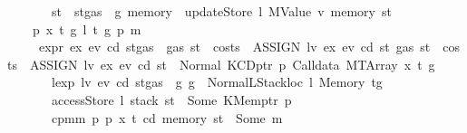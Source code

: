 \begin{isabellebody}
\ \ \ \ \ \ \ {\isachardoublequoteopen}st{\isacharprime}{\kern0pt}\ {\isacharequal}{\kern0pt}\ st{\isasymlparr}gas\ {\isacharcolon}{\kern0pt}{\isacharequal}{\kern0pt}\ g{\isacharprime}{\kern0pt}{\isacharcomma}{\kern0pt}\ memory\ {\isacharcolon}{\kern0pt}{\isacharequal}{\kern0pt}\ updateStore\ l\ {\isacharparenleft}{\kern0pt}MValue\ v{\isacharprime}{\kern0pt}{\isacharparenright}{\kern0pt}\ {\isacharparenleft}{\kern0pt}memory\ st{\isacharparenright}{\kern0pt}{\isasymrparr}{\isachardoublequoteclose}\isanewline
\ \ {\isacharbar}{\kern0pt}\ {\isacharparenleft}{\kern0pt}{}{\isacharparenright}{\kern0pt}\ p\ x\ t\ g\ l\ t{\isacharprime}{\kern0pt}\ g{\isacharprime}{\kern0pt}\ p{\isacharprime}{\kern0pt}\ m\isanewline
\ \ \ \ \ {\isachardoublequoteopen}expr\ ex\ ev\ cd\ {\isacharparenleft}{\kern0pt}st{\isasymlparr}gas\ {\isacharcolon}{\kern0pt}{\isacharequal}{\kern0pt}\ gas\ st\ {\isacharminus}{\kern0pt}\ costs\ \ {\isacharparenleft}{\kern0pt}ASSIGN\ lv\ ex{\isacharparenright}{\kern0pt}\ ev\ cd\ st{\isasymrparr}{\isacharparenright}{\kern0pt}\ {\isacharparenleft}{\kern0pt}gas\ st\ {\isacharminus}{\kern0pt}\ costs\ \ {\isacharparenleft}{\kern0pt}ASSIGN\ lv\ ex{\isacharparenright}{\kern0pt}\ ev\ cd\ st{\isacharparenright}{\kern0pt}\ {\isacharequal}{\kern0pt}\ Normal\ {\isacharparenleft}{\kern0pt}{\isacharparenleft}{\kern0pt}KCDptr\ p{\isacharcomma}{\kern0pt}\ Calldata\ {\isacharparenleft}{\kern0pt}MTArray\ x\ t{\isacharparenright}{\kern0pt}{\isacharparenright}{\kern0pt}{\isacharcomma}{\kern0pt}\ g{\isacharparenright}{\kern0pt}{\isachardoublequoteclose}\isanewline
\ \ \ \ \ \ \ {\isachardoublequoteopen}lexp\ lv\ ev\ cd\ {\isacharparenleft}{\kern0pt}st{\isasymlparr}gas\ {\isacharcolon}{\kern0pt}{\isacharequal}{\kern0pt}\ g{\isasymrparr}{\isacharparenright}{\kern0pt}\ g\ {\isacharequal}{\kern0pt}\ Normal{\isacharparenleft}{\kern0pt}{\isacharparenleft}{\kern0pt}LStackloc\ l{\isacharcomma}{\kern0pt}\ Memory\ t{\isacharprime}{\kern0pt}{\isacharparenright}{\kern0pt}{\isacharcomma}{\kern0pt}g{\isacharprime}{\kern0pt}{\isacharparenright}{\kern0pt}{\isachardoublequoteclose}\isanewline
\ \ \ \ \ \ \ {\isachardoublequoteopen}accessStore\ l\ {\isacharparenleft}{\kern0pt}stack\ st{\isacharparenright}{\kern0pt}\ {\isacharequal}{\kern0pt}\ Some\ {\isacharparenleft}{\kern0pt}KMemptr\ p{\isacharprime}{\kern0pt}{\isacharparenright}{\kern0pt}{\isachardoublequoteclose}\isanewline
\ \ \ \ \ \ \ {\isachardoublequoteopen}cpm{}m\ p\ p{\isacharprime}{\kern0pt}\ x\ t\ cd\ {\isacharparenleft}{\kern0pt}memory\ st{\isacharparenright}{\kern0pt}\ {\isacharequal}{\kern0pt}\ Some\ m{\isachardoublequoteclose}\isanewline

\end{isabellebody}

